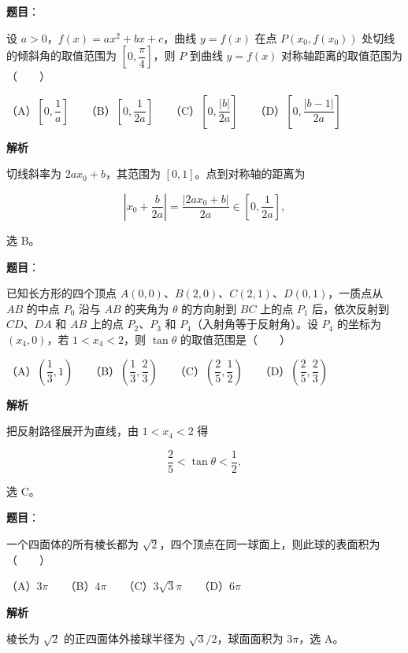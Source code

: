 \begin{answer}

\textbf{题目}：

设 $a>0$，$f(x)=ax^2+bx+c$，曲线 $y=f(x)$ 在点 $P(x_0,f(x_0))$ 处切线的倾斜角的取值范围为 $\left[0,\dfrac\pi4\right]$，则 $P$ 到曲线 $y=f(x)$ 对称轴距离的取值范围为\mbox{（　　）}

（A）$\left[0,\dfrac1a\right]$　　（B）$\left[0,\dfrac1{2a}\right]$　　（C）$\left[0,\dfrac{|b|}{2a}\right]$　　（D）$\left[0,\dfrac{|b-1|}{2a}\right]$

\textbf{解析}

切线斜率为 $2ax_0+b$，其范围为 $[0,1]$。点到对称轴的距离为

\nopagebreak[4]
\[
\left|x_0+\frac{b}{2a}\right|
=\frac{|2ax_0+b|}{2a}\in\left[0,\frac1{2a}\right],
\]

选 B。


\end{answer}
\begin{answer}

\textbf{题目}：

已知长方形的四个顶点 $A(0,0)\text{、}B(2,0)\text{、}C(2,1)\text{、}D(0,1)$，一质点从 $AB$ 的中点 $P_0$ 沿与 $AB$ 的夹角为 $\theta$ 的方向射到 $BC$ 上的点 $P_1$ 后，依次反射到 $CD\text{、}DA$ 和 $AB$ 上的点 $P_2\text{、}P_3$ 和 $P_4$（入射角等于反射角）。设 $P_4$ 的坐标为 $(x_4,0)$，若 $1<x_4<2$，则 $\tan\theta$ 的取值范围是\mbox{（　　）}

（A）$\left(\dfrac13,1\right)$　　（B）$\left(\dfrac13,\dfrac23\right)$　　（C）$\left(\dfrac25,\dfrac12\right)$　　（D）$\left(\dfrac25,\dfrac23\right)$

\textbf{解析}

把反射路径展开为直线，由 $1<x_4<2$ 得

\nopagebreak[4]
\[
\frac25<\tan\theta<\frac12,
\]

选 C。


\end{answer}
\begin{answer}

\textbf{题目}：

一个四面体的所有棱长都为 $\sqrt2$，四个顶点在同一球面上，则此球的表面积为\mbox{（　　）}

（A）$3\pi$　　（B）$4\pi$　　（C）$3\sqrt3\pi$　　（D）$6\pi$

\textbf{解析}

棱长为 $\sqrt2$ 的正四面体外接球半径为 $\sqrt3/2$，球面面积为 $3\pi$，选 A。


\end{answer}

